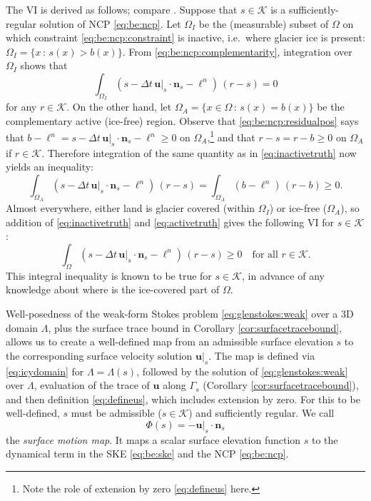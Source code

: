 \documentclass[hidelinks,onefignum,onetabnum,final]{siamart220329}  %
\newcommand{\bn}{\mathbf{n}}
\newcommand{\bu}{\mathbf{u}}
\newcommand{\cK}{\mathcal{K}}
\begin{document}
The VI is derived as follows; compare \cite{Bueler2021conservation}.  Suppose that $s \in \cK$ is a sufficiently-regular solution of NCP \eqref{eq:be:ncp}.  Let $\Omega_I$ be the (measurable) subset of $\Omega$ on which constraint \eqref{eq:be:ncp:constraint} is inactive, i.e.~where glacier ice is present: $\Omega_I = \{x\,:\,s(x)>b(x)\}$.  From \eqref{eq:be:ncp:complementarity}, integration over $\Omega_I$ shows that
\begin{equation}
\int_{\Omega_I} \left(s - \Delta t\,\bu|_s \cdot \bn_s - \ell^n\right)\,(r-s) = 0  \label{eq:inactivetruth}
\end{equation}
for any $r\in\cK$.  On the other hand, let $\Omega_A = \{x \in \Omega \,:\,s(x)=b(x)\}$ be the complementary active (ice-free) region.  Observe that \eqref{eq:be:ncp:residualpos} says that $b-\ell^n = s - \Delta t\,\bu|_s \cdot \bn_s - \ell^n \ge 0$ on $\Omega_A$,\footnote{Note the role of extension by zero \eqref{eq:defineus} here.} and that $r-s=r-b\ge 0$ on $\Omega_A$ if $r\in\cK$.  Therefore integration of the same quantity as in \eqref{eq:inactivetruth} now yields an inequality:
\begin{equation}
\int_{\Omega_A} \left(s - \Delta t\,\bu|_s \cdot \bn_s - \ell^n\right)\,(r-s) = \int_{\Omega_A} \left(b - \ell^n\right)\,(r-b) \ge 0.  \label{eq:activetruth}
\end{equation}
Almost everywhere, either land is glacier covered (within $\Omega_I$) or ice-free ($\Omega_A$), so addition of \eqref{eq:inactivetruth} and \eqref{eq:activetruth} gives the following VI for $s \in \cK$:
\begin{equation}
\int_\Omega \left(s - \Delta t\,\bu|_s \cdot \bn_s - \ell^n\right)\,(r-s) \ge 0 \quad \text{for all } r \in \cK. \label{eq:be:viearly}
\end{equation}
This integral inequality is known to be true for $s\in\cK$, in advance of any knowledge about where is the ice-covered part of $\Omega$.
	
Well-posedness of the weak-form Stokes problem \eqref{eq:glenstokes:weak} over a 3D domain $\Lambda$, plus the surface trace bound in Corollary \ref{cor:surfacetracebound}, allows us to create a well-defined map from an admissible surface elevation $s$ to the corresponding surface velocity solution $\bu|_s$.  The map is defined via \eqref{eq:icydomain} for $\Lambda=\Lambda(s)$, followed by the solution of \eqref{eq:glenstokes:weak} over $\Lambda$, evaluation of the trace of $\bu$ along $\Gamma_s$ (Corollary \ref{cor:surfacetracebound}), and then definition \eqref{eq:defineus}, which includes extension by zero.  For this to be well-defined, $s$ must be admissible ($s\in\cK$) and sufficiently regular.  We call
\begin{equation}
\Phi(s) = - \bu|_s\cdot \bn_s \label{eq:definePhi:asfunction}
\end{equation}
the \emph{surface motion map}.  It maps a scalar surface elevation function $s$ to the dynamical term in the SKE \eqref{eq:be:ske} and the NCP \eqref{eq:be:ncp}.
\end{document}
